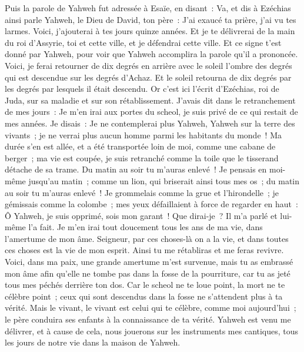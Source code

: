 \begin{multicols}{2}
Puis la parole de Yahweh fut adressée à Esaïe, en disant~:
Va, et dis à Ezéchias ainsi parle Yahweh, le Dieu de David, ton père~: J'ai exaucé ta prière, j'ai vu tes larmes. Voici, j'ajouterai à tes jours quinze années.
Et je te délivrerai de la main du roi d'Assyrie, toi et cette ville, et je défendrai cette ville.
Et ce signe t'est donné par Yahweh, pour voir que Yahweh accomplira la parole qu'il a prononcée.
Voici, je ferai retourner de dix degrés en arrière avec le soleil l'ombre des degrés qui est descendue sur les degrés d'Achaz. Et le soleil retourna de dix degrés par les degrés par lesquels il était descendu.
Or c'est ici l'écrit d'Ezéchias, roi de Juda, sur sa maladie et sur son rétablissement.
J'avais dit dans le retranchement de mes jours~: Je m'en irai aux portes du scheol, je suis privé de ce qui restait de mes années.
Je disais~: Je ne contemplerai plus Yahweh, Yahweh sur la terre des vivants~; je ne verrai plus aucun homme parmi les habitants du monde~!
Ma durée s'en est allée, et a été transportée loin de moi, comme une cabane de berger~; ma vie est coupée, je suis retranché comme la toile que le tisserand détache de sa trame. Du matin au soir tu m'auras enlevé~!
Je pensais en moi-même jusqu'au matin~; comme un lion, qui briserait ainsi tous mes os~; du matin au soir tu m'auras enlevé~!
Je grommelais comme la grue et l'hirondelle~; je gémissais comme la colombe~; mes yeux défaillaient à force de regarder en haut~: Ô Yahweh, je suis opprimé, sois mon garant~!
Que dirai-je~? Il m'a parlé et lui-même l'a fait. Je m'en irai tout doucement tous les ans de ma vie, dans l'amertume de mon âme.
Seigneur, par ces choses-là on a la vie, et dans toutes ces choses est la vie de mon esprit. Ainsi tu me rétabliras et me feras revivre.
Voici, dans ma paix, une grande amertume m'est survenue, mais tu as embrassé mon âme afin qu'elle ne tombe pas dans la fosse de la pourriture, car tu as jeté tous mes péchés derrière ton dos.
Car le scheol ne te loue point, la mort ne te célèbre point~; ceux qui sont descendus dans la fosse ne s'attendent plus à ta vérité.
Mais le vivant, le vivant est celui qui te célèbre, comme moi aujourd'hui~; le père conduira ses enfants à la connaissance de ta vérité.
Yahweh est venu me délivrer, et à cause de cela, nous jouerons sur les instruments mes cantiques, tous les jours de notre vie dans la maison de Yahweh.

\end{multicols}

